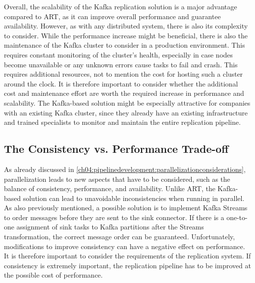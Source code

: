 Overall, the scalability of the Kafka replication solution is a major advantage compared to \ac{ART}, as it can improve overall performance and guarantee availability. However, as with any distributed system, there is also its complexity to consider. While the performance increase might be beneficial, there is also the maintenance of the Kafka cluster to consider in a production environment. This requires constant monitoring of the cluster's health, especially in case nodes become unavailable or any unknown errors cause tasks to fail and crash. This requires additional resources, not to mention the cost for hosting such a cluster around the clock. It is therefore important to consider whether the additional cost and maintenance effort are worth the required increase in performance and scalability. The Kafka-based solution might be especially attractive for companies with an existing Kafka cluster, since they already have an existing infrastructure and trained specialists to monitor and maintain the entire replication pipeline.

\subsection{The Consistency vs. Performance Trade-off}
As already discussed in \ref{ch04:pipelinedevelopment:parallelizationconsiderations}, parallelization leads to new aspects that have to be considered, such as the balance of consistency, performance, and availability. Unlike \ac{ART}, the Kafka-based solution can lead to unavoidable inconsistencies when running in parallel. As also previously mentioned, a possible solution is to implement Kafka Streams to order messages before they are sent to the sink connector. If there is a one-to-one assignment of sink tasks to Kafka partitions after the Streams transformation, the correct message order can be guaranteed. Unfortunately, modifications to improve consistency can have a negative effect on performance. It is therefore important to consider the requirements of the replication system. If consistency is extremely important, the replication pipeline has to be improved at the possible cost of performance.

